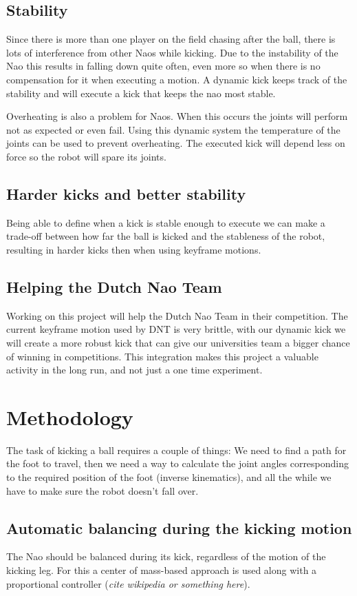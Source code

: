 \documentclass[a4paper]{article}
\begin{document}
\subsection{Stability}
Since there is more than one player on
the field  chasing after the ball,
there is lots of interference from other Naos while kicking. Due to the
instability of the Nao this results in falling down quite often, even more
so when there is no compensation for it when executing a motion. A dynamic
kick keeps track of the stability and will execute a kick that keeps the nao
most stable.

Overheating is also a problem for Naos. When this occurs the joints will perform
not as expected or even fail. Using this dynamic system the temperature of the
joints can be used to prevent overheating. The executed kick will depend less
on force so the robot will spare its joints.

\subsection{Harder kicks and better stability}
Being able to define when a kick is stable enough to execute we can make a
trade-off between how far the ball is kicked and the stableness of the
robot, resulting in harder kicks then when using keyframe motions.

\subsection{Helping the Dutch Nao Team}
 Working on this project will help the Dutch Nao Team in their competition. The
current keyframe motion used by DNT is very brittle, with our dynamic kick we will create a
more robust kick that can give our universities team a bigger chance of
winning in competitions. 
This integration makes this project a valuable activity in the long run, and not
just a one time experiment.

\section{Methodology}
The task of kicking a ball requires a couple of things: We need to find a path
for the foot to travel, then we need a way to calculate the joint angles
corresponding to the required position of the foot (inverse kinematics), and all
the while we have to make sure the robot doesn't fall over.

\subsection{Automatic balancing during the kicking motion}
The Nao should be balanced during its kick, regardless of the motion of the
kicking leg. For this a center of mass-based approach is used along with a
proportional controller (\emph{cite wikipedia or something here}).
\end{document}
